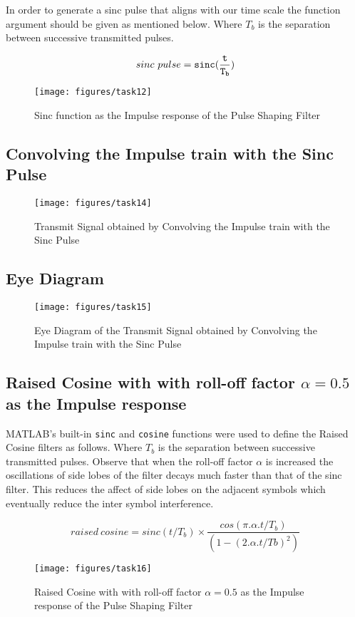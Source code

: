 \documentclass[a4paper,11pt]{article}%
\begin{document}
In order to generate  a sinc pulse that aligns with our time scale the function argument should be given as mentioned below. Where $T_b$ is the separation between
successive transmitted pulses.

\[
sinc~pulse = {\tt sinc(\frac{t}{T_b})}
\]
\begin{figure}[H]
	\centering
	\texttt{[image: figures/task12]}
	\caption{Sinc function as the Impulse response of the Pulse Shaping Filter}
\end{figure}

\subsection{Convolving the Impulse train with the Sinc Pulse}

\begin{figure}[H]
	\centering
	\texttt{[image: figures/task14]}
	\caption{Transmit Signal obtained by Convolving the Impulse train with the Sinc Pulse}
\end{figure}

\subsection{Eye Diagram}

\begin{figure}[H]
	\centering
	\texttt{[image: figures/task15]}
	\caption{Eye Diagram of the Transmit Signal obtained by Convolving the Impulse train with the Sinc Pulse}
\end{figure}

\subsection{Raised Cosine with with roll-off factor $\alpha = 0.5$ as the Impulse response}
MATLAB's built-in {\tt sinc} and {\tt cosine} functions were used to define the Raised Cosine filters as follows. Where $T_b$ is the separation between successive transmitted pulses. Observe that when the roll-off factor $\alpha$ is increased the oscillations of side lobes of the filter decays much faster than that of the sinc filter. This reduces the affect of side lobes on the adjacent symbols which eventually reduce the inter symbol interference.

\[
raised~cosine = sinc(t/T_b)\times \frac{cos(\pi.\alpha.t/T_b)}{ (1 - (2.\alpha.t/Tb)^2 )}
\]

\begin{figure}[H]
	\centering
	\texttt{[image: figures/task16]}
	\caption{Raised Cosine with with roll-off factor $\alpha = 0.5$ as the Impulse response of the Pulse Shaping Filter}
\end{figure}
\end{document}

